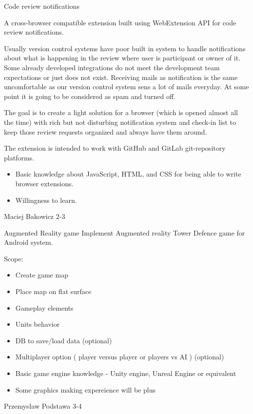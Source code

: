\begin{project}
{Code review notifications}
{
A cross-browser compatible extension built using WebExtension API for code review notifications.

Usually version control systems have poor built in system to handle notifications about what is happening in the review where user is participant or owner of it. Some already developed integrations do not meet the development team expectations or just does not exist. Receiving mails as notification is the same uncomfortable as our version control system sens a lot of mails everyday. At some point it is going to be considered as spam and turned off.
} 
{
The goal is to create a light solution for a browser (which is opened almost all the time) with rich but not disturbing notification system and check-in list to keep those review requests organized and always have them around.

The extension is intended to work with GitHub and GitLab git-repository platforms.
}
{
\begin{itemize}
	\item Basic knowledge about JavaScript, HTML, and CSS for being able to write browser extensions.
	\item Willingness to learn.
\end{itemize}
}
{Maciej Bakowicz}
{2-3}
\end{project}
\begin{project}
{Augmented Reality game}
{Implement Augmented reality Tower Defence game for Android system.}
{
Scope:
\begin{itemize}
	\item Create game map
	\item Place map on flat surface
	\item Gameplay elements
	\item Units behavior
	\item DB to save/load data (optional)
	\item Multiplayer option ( player versus player or players vs AI ) (optional)
\end{itemize}
}
{
\begin{itemize}
	\item Basic game engine knowledge - Unity engine, Unreal Engine or equivalent
	\item Some graphics making expereience will be plus
\end{itemize}
}
{Przemysław Podstawa}
{3-4}
\end{project}
